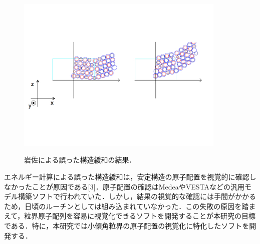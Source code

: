 \begin{figure}[htbp]\begin{center}
\includegraphics[width=10cm,bb= 0 0 737 553]{../figs/./boundary_narita.004.jpeg}
\caption{岩佐による誤った構造緩和の結果．}
\label{fig:004}
\label{default}\end{center}\end{figure}
エネルギー計算による誤った構造緩和は，安定構造の原子配置を視覚的に確認しなかったことが原因である[3]．原子配置の確認はMedeaやVESTAなどの汎用モデル構築ソフトで行われていた．しかし，結果の視覚的な確認には手間がかかるため，日頃のルーチンとしては組み込まれていなかった．この失敗の原因を踏まえて，粒界原子配列を容易に視覚化できるソフトを開発することが本研究の目標である．特に，本研究では小傾角粒界の原子配置の視覚化に特化したソフトを開発する．

